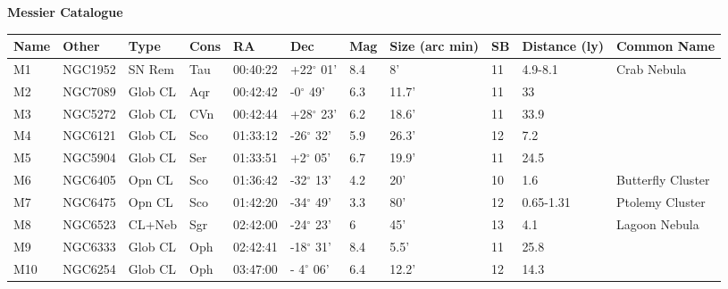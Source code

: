 \documentclass[10pt,twoside,a4paper,english]{article}
\begin{document}
{\bf Messier Catalogue} 
\begin{longtable}{@{}lllllllllll@{}} 
\hline 
{\bf Name} & {\bf Other} & {\bf Type} & {\bf Cons} & {\bf RA}  & {\bf Dec} & {\bf Mag} & {\bf Size (arc min)} & {\bf SB} & {\bf Distance (ly)} & {\bf Common Name}               \\ 
\hline 
M1         & NGC1952     & SN Rem     & Tau       & 00:40:22 & +22$^{\circ}$ 01'  & 8.4       & 8'                   & 11       & 4.9-8.1             & Crab Nebula                               \\ 
M2         & NGC7089     & Glob CL    & Aqr       & 00:42:42 & -0$^{\circ}$ 49'   & 6.3       & 11.7'                & 11       & 33                  &                                           \\ 
M3         & NGC5272     & Glob CL    & CVn       & 00:42:44 & +28$^{\circ}$ 23'  & 6.2       & 18.6'                & 11       & 33.9                &                                           \\ 
M4         & NGC6121     & Glob CL    & Sco       & 01:33:12 & -26$^{\circ}$ 32'  & 5.9       & 26.3'                & 12       & 7.2                 &                                           \\ 
M5         & NGC5904     & Glob CL    & Ser       & 01:33:51 & +2$^{\circ}$ 05'   & 6.7       & 19.9'                & 11       & 24.5                &                                           \\ 
M6         & NGC6405     & Opn CL     & Sco       & 01:36:42 & -32$^{\circ}$ 13'  & 4.2       & 20'                  & 10       & 1.6                 & Butterfly Cluster                         \\ 
M7         & NGC6475     & Opn CL     & Sco       & 01:42:20 & -34$^{\circ}$ 49'  & 3.3       & 80'                  & 12       & 0.65-1.31           & Ptolemy Cluster                           \\ 
M8         & NGC6523     & CL+Neb     & Sgr       & 02:42:00 & -24$^{\circ}$ 23'  & 6         & 45'                  & 13       & 4.1                 & Lagoon Nebula                             \\ 
M9         & NGC6333     & Glob CL    & Oph       & 02:42:41 & -18$^{\circ}$ 31'  & 8.4       & 5.5'                 & 11       & 25.8                &                                           \\ 
M10        & NGC6254     & Glob CL    & Oph       & 03:47:00 & - 4$^{\circ}$ 06'  & 6.4       & 12.2'                & 12       & 14.3                &                                           \\ 

\end{longtable}
\end{document}

